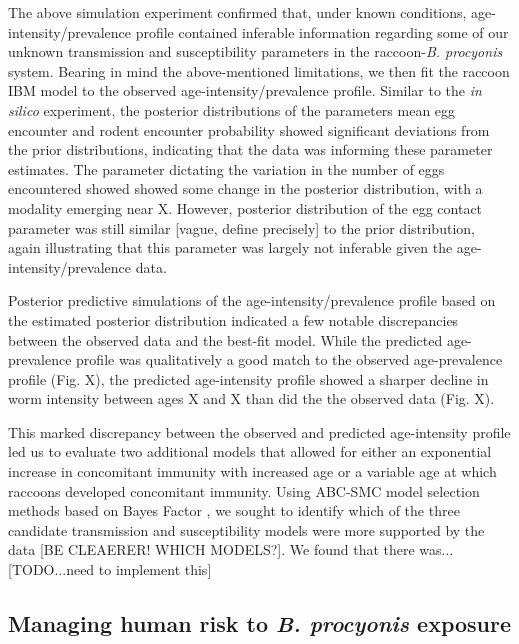 \documentclass[11pt]{article}
\begin{document}
The above simulation experiment confirmed that, under known conditions, age-intensity/prevalence profile contained inferable information regarding some of our unknown transmission and susceptibility parameters in the raccoon-\emph{B. procyonis} system.  Bearing in mind the above-mentioned limitations, we then fit the raccoon IBM model to the observed age-intensity/prevalence profile. Similar to the \emph{in silico} experiment, the posterior distributions of the parameters mean egg encounter and rodent encounter probability showed significant deviations from the prior distributions, indicating that the data was informing these parameter estimates.  The parameter dictating the variation in the number of eggs encountered showed showed some change in the posterior distribution, with a modality emerging near X.  However, posterior distribution of the egg contact parameter was still similar [vague, define precisely] to the prior distribution, again illustrating that this parameter was largely not inferable given the age-intensity/prevalence data.

Posterior predictive simulations of the age-intensity/prevalence profile based on the estimated posterior distribution indicated a few notable discrepancies between the observed data and the best-fit model.  While the predicted age-prevalence profile was qualitatively a good match to the observed age-prevalence profile (Fig. X), the predicted age-intensity profile showed a sharper decline in worm intensity between ages X and X than did the the observed data (Fig. X).

This marked discrepancy between the observed and predicted age-intensity profile led us to evaluate two additional models that allowed for either an exponential increase in concomitant immunity with increased age or a variable age at which raccoons developed concomitant immunity.  Using ABC-SMC model selection methods based on Bayes Factor \citep{Toni2009}, we sought to identify which of the three candidate transmission and susceptibility models were more supported by the data [BE CLEAERER! WHICH MODELS?].  We found that there was...[TODO...need to implement this] 

\subsection{Managing human risk to \emph{B. procyonis} exposure}
\end{document}
